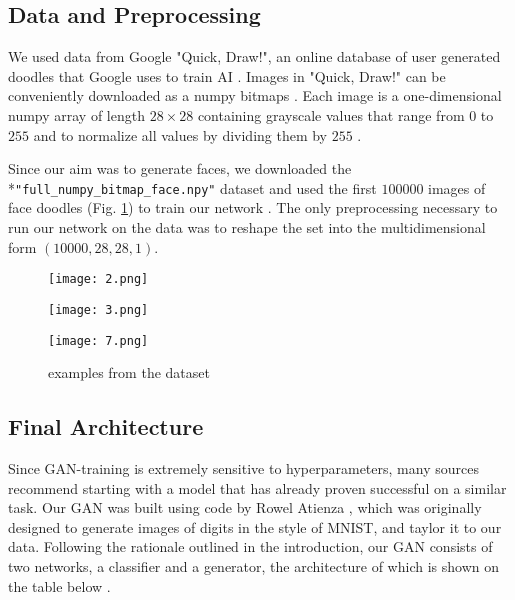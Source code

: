 \documentclass[11pt]{article}
\begin{document}
\begin{comment}
In this section you should explain the details about your project.

If your project is based on a Kaggle competition, this should include
describing the data set used (number of patterns, number of features,
description of features, any preprocessing that was necessary) and its
source.

You should provide all of the parameter settings used (such as
learning rate, etc.).  You should also provide details about how the
system was trained, and how you determined when to end training.
\end{comment}

\subsection{Data and Preprocessing}
We used data from Google "Quick, Draw!", an online database of user generated
doodles that Google uses to train AI \cite{google}. Images in "Quick, Draw!" can be
conveniently downloaded as a numpy bitmaps \cite{google}. Each image is a one-dimensional numpy array of length $28\times 28$ containing grayscale values that range from $0$ to $255$ and to normalize all values by dividing them by $255$ \cite{google}.

Since our aim was to generate faces, we downloaded the
\\*\texttt{"full\_numpy\_bitmap\_face.npy"} dataset and used the first $100000$ images of face
doodles (Fig. \ref{fig:ex}) to train our network \cite{google}. The only preprocessing necessary to run our
network on the data was to reshape the set into the multidimensional form
$(10000, 28, 28, 1)$.

\begin{figure}[H]
 \centering
 \begin{minipage}[b]{0.2\textwidth}
   \texttt{[image: 2.png]}
 \end{minipage}
 \begin{minipage}[b]{0.2\textwidth}
   \texttt{[image: 3.png]}
 \end{minipage}
 \begin{minipage}[b]{0.2\textwidth}
   \texttt{[image: 7.png]}
 \end{minipage}
 \caption{examples from the dataset}
 \label{fig:ex}
\end{figure}

\subsection{Final Architecture}
Since GAN-training is extremely sensitive to hyperparameters, many sources recommend starting with a model that has already proven successful on a similar task. Our GAN was built using code by Rowel Atienza \cite{gan}, which was originally designed to generate images of digits in the style of MNIST, and taylor it to our data. Following the rationale outlined in the introduction, our GAN consists of two networks, a classifier and a generator, the architecture of which is shown on the table below \cite{gan}.
\end{document}
